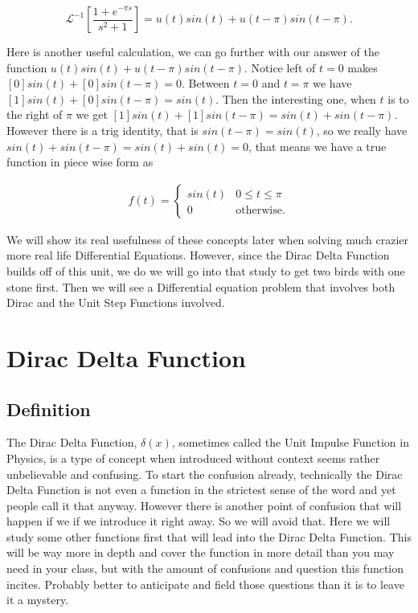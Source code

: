 \documentclass[12pt]{article}
\newcommand{\lp}{\mathscr{L}}
\begin{document}
\begin{equation*}
    \lp^{-1}\left[\frac{1+e^{-\pi s}}{s^2+1}\right]=u(t)sin(t)+u(t-\pi)sin(t-\pi).
\end{equation*}

Here is another useful calculation, we can go further with our answer of the function $u(t)sin(t)+u(t-\pi)sin(t-\pi)$. Notice left of $t=0$ makes $[0]sin(t)+[0]sin(t-\pi)=0$. Between $t=0$ and $t=\pi$ we have $[1]sin(t)+[0]sin(t-\pi)=sin(t)$. Then the interesting one, when $t$ is to the right of $\pi$ we get $[1]sin(t)+[1]sin(t-\pi)=sin(t)+sin(t-\pi)$. However there is a trig identity, that is $sin(t-\pi)=sin(t)$, so we really have $sin(t)+sin(t-\pi)=sin(t)+sin(t)=0$, that means we have a true function in piece wise form as

\begin{align*}
    f(t) = \left\{
        \begin{array}{cc}
            sin(t) & 0 \leq t \leq \pi \\
            0 & \text{otherwise}. 
        \end{array}
    \right.
\end{align*}

We will show its real usefulness of these concepts later when solving much crazier more real life Differential Equations. However, since the Dirac Delta Function builds off of this unit, we do we will go into that study to get two birds with one stone first. Then we will see a Differential equation problem that involves both Dirac and the Unit Step Functions involved.

\section{Dirac Delta Function}

\subsection{Definition}

The Dirac Delta Function, $\delta(x)$, sometimes called the Unit Impulse Function in Physics, is a type of concept when introduced without context seems rather unbelievable and confusing. To start the confusion already, technically the Dirac Delta Function is not even a function in the strictest sense of the word and yet people call it that anyway. However there is another point of confusion that will happen if we if we introduce it right away. So we will avoid that. Here we will study some other functions first that will lead into the Dirac Delta Function. This will be way more in depth and cover the function in more detail than you may need in your class, but with the amount of confusions and question this function incites. Probably better to anticipate and field those questions than it is to leave it a mystery. \\
\end{document}
